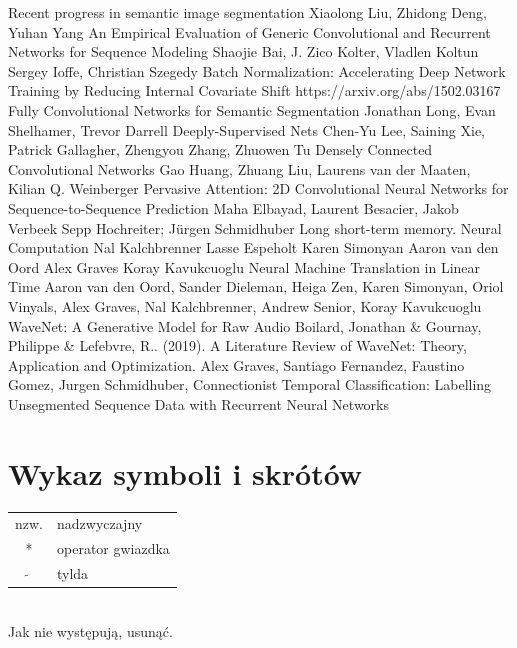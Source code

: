 \documentclass[a4paper,11pt,twoside]{report}
\theoremstyle{definition}
\begin{document}
\begin{thebibliography}{20}
 Recent progress in semantic image segmentation Xiaolong Liu, Zhidong Deng, Yuhan Yang
 An Empirical Evaluation of Generic Convolutional and Recurrent Networks for Sequence Modeling Shaojie Bai, J. Zico Kolter, Vladlen Koltun
Sergey Ioffe, Christian Szegedy Batch Normalization: Accelerating Deep Network Training by Reducing Internal Covariate Shift https://arxiv.org/abs/1502.03167
Fully Convolutional Networks for Semantic Segmentation Jonathan Long, Evan Shelhamer, Trevor Darrell
Deeply-Supervised Nets Chen-Yu Lee, Saining Xie, Patrick Gallagher, Zhengyou Zhang, Zhuowen Tu
Densely Connected Convolutional Networks Gao Huang, Zhuang Liu, Laurens van der Maaten, Kilian Q. Weinberger
Pervasive Attention: 2D Convolutional Neural Networks for Sequence-to-Sequence Prediction Maha Elbayad, Laurent Besacier, Jakob Verbeek
 Sepp Hochreiter; Jürgen Schmidhuber Long short-term memory. Neural Computation
 Nal Kalchbrenner  Lasse Espeholt  Karen Simonyan  Aaron van den Oord  Alex Graves  Koray Kavukcuoglu Neural Machine Translation in Linear Time
Aaron van den Oord, Sander Dieleman, Heiga Zen, Karen Simonyan, Oriol Vinyals, Alex Graves, Nal Kalchbrenner, Andrew Senior, Koray Kavukcuoglu WaveNet: A Generative Model for Raw Audio
 Boilard, Jonathan \& Gournay, Philippe \& Lefebvre, R.. (2019). A Literature Review of WaveNet: Theory, Application and Optimization. 
Alex Graves, Santiago Fernandez, Faustino Gomez, Jurgen Schmidhuber, Connectionist Temporal Classification: Labelling Unsegmented Sequence Data with Recurrent Neural Networks
\end{thebibliography}

\thispagestyle{empty}



\chapter*{Wykaz symboli i skrótów}

\begin{tabular}{cl}
nzw. & nadzwyczajny \\
* & operator gwiazdka \\
$\widetilde{}$ & tylda
\end{tabular}
\\
Jak nie występują, usunąć.
\thispagestyle{empty}
\end{document}
